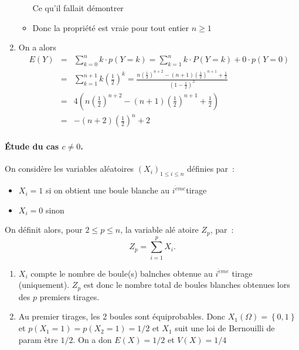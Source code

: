 \begin{correction}
\begin{enumerate}
\begin{itemize}
Ce qu'il fallait d\'{e}montrer

\item Donc la propri\'{e}t\'{e} est vraie pour tout entier $n\ge 1$
\end{itemize}

\item On a alors 
\begin{eqnarray*}
E\left( Y\right) &=&\sum_{k=0}^{n}k\cdot p\left( Y=k\right)
=\sum_{k=1}^{n}k\cdot P(Y=k)+0\cdot p\left( Y=0\right) \\
&=&\sum_{k=1}^{n+1}k\left( \frac{1}{2}\right) ^{k}=\frac{n\left( \frac{1}{2}%
\right) ^{n+2}-(n+1)\left( \frac{1}{2}\right) ^{n+1}+\frac{1}{2}}{(1-\frac{1%
}{2})^{2}} \\
&=&4\left( n\left( \frac{1}{2}\right) ^{n+2}-(n+1)\left( \frac{1}{2}\right)
^{n+1}+\frac{1}{2}\right) \\
&=&-\left( n+2\right) \left( \frac{1}{2}\right) ^{n}+2
\end{eqnarray*}
\end{enumerate}

\paragraph{\'Etude du cas $c\neq 0$.}

On consid\`{e}re les variables al\'{e}atoires $\left( X_{i}\right)
_{1\leqslant i\leqslant n}$ d\'{e}finies par~:

\begin{itemize}
\item $X_{i}=1$ si on obtient une boule blanche au $i^{\grave{e}me}$tirage

\item $X_{i}=0$ sinon
\end{itemize}

On d\'{e}finit alors, pour $2\leqslant p\leqslant n$, la variable al\'{e}%
atoire $Z_{p}$, par~: 
\begin{equation*}
Z_{p}=\sum_{i=1}^{p}X_{i}.
\end{equation*}

\begin{enumerate}
\item $X_{i}$ compte le nombre de boule(s) balnches obtenue au $i^{\grave{e}%
me}$ tirage (uniquement). $Z_{p}$ est donc le nombre total de boules
blanches obtenues lors des $p$ premiers tirages.

\item Au premier tirages, les 2 boules sont \'{e}quiprobables. Donc $%
X_{1}\left( \Omega \right) =\left\{ 0,1\right\} $ et $p\left( X_{1}=1\right)
=p\left( X_{2}=1\right) =1/2$ et $X_{1}$ suit une loi de Bernouilli de param%
\`{e}tre $1/2.$ On a don $E\left( X\right) =1/2$ et $V\left( X\right) =1/4$


\end{enumerate}
\end{correction}
